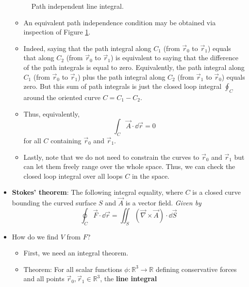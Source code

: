 \documentclass[../notes.tex]{subfiles}
\begin{document}
\begin{itemize}
\begin{figure}[h!]
        \caption{Path independent line integral.}
        \label{fig:pathIndependent}
    \end{figure}
    \begin{itemize}
        \item An equivalent path independence condition may be obtained via inspection of Figure \ref{fig:pathIndependent}.
        \item Indeed, saying that the path integral along $C_1$ (from $\vec{r}_0$ to $\vec{r}_1$) equals that along $C_2$ (from $\vec{r}_0$ to $\vec{r}_1$) is equivalent to saying that the difference of the path integrals is equal to zero. Equivalently, the path integral along $C_1$ (from $\vec{r}_0$ to $\vec{r}_1$) plus the path integral along $C_2$ (from $\vec{r}_1$ to $\vec{r}_0$) equals zero. But this sum of path integrals is just the closed loop integral $\oint_C$ around the oriented curve $C=C_1-C_2$.
        \item Thus, equivalently,
        \begin{equation*}
            \int_C\vec{A}\cdot\dd\vec{r} = 0
        \end{equation*}
        for all $C$ containing $\vec{r}_0$ and $\vec{r}_1$.
        \item Lastly, note that we do not need to constrain the curves to $\vec{r}_0$ and $\vec{r}_1$ but can let them freely range over the whole space. Thus, we can check the closed loop integral over all loops $C$ in the space.
    \end{itemize}
    \item \textbf{Stokes' theorem}: The following integral equality, where $C$ is a closed curve bounding the curved surface $S$ and $\vec{A}$ is a vector field. \emph{Given by}
    \begin{equation*}
        \oint_C\vec{F}\cdot\dd\vec{r} = \iint_S(\vec{\nabla}\times\vec{A})\cdot\dd{\vec{S}}
    \end{equation*}
    \item How do we find $V$ from $F$?
    \begin{itemize}
        \item First, we need an integral theorem.
        \item Theorem: For all scalar functions $\phi:\mathbb{R}^3\to\mathbb{R}$ defining conservative forces and all points $\vec{r}_0,\vec{r}_1\in\mathbb{R}^3$, the \textbf{line integral}

\end{itemize}
\end{itemize}
\end{document}
